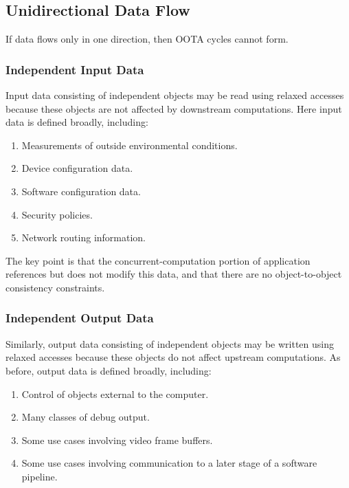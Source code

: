 \documentclass[10]{article}
\begin{document}
\subsection{Unidirectional Data Flow}
\label{sec:Unidirectional Data Flow}

If data flows only in one direction, then OOTA cycles cannot form.

\subsubsection{Independent Input Data}
\label{sec:Independent Input Data}

Input data consisting of independent objects may be read using relaxed
accesses because these objects are not affected by downstream computations.
Here input data is defined broadly, including:

\begin{enumerate}
\item	Measurements of outside environmental conditions.
\item	Device configuration data.
\item	Software configuration data.
\item	Security policies.
\item	Network routing information.
\end{enumerate}

The key point is that the concurrent-computation portion of application
references but does not modify this data, and that there are no
object-to-object consistency constraints.

\subsubsection{Independent Output Data}
\label{sec:Independent Output Data}

Similarly, output data consisting of independent objects may be written
using relaxed accesses because these objects do not affect upstream
computations.
As before, output data is defined broadly, including:

\begin{enumerate}
\item	Control of objects external to the computer.
\item	Many classes of debug output.
\item	Some use cases involving video frame buffers.
\item	Some use cases involving communication to a later stage of a
	software pipeline.
\end{enumerate}
\end{document}
